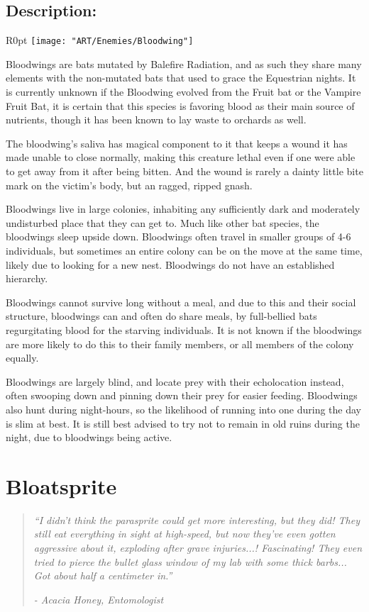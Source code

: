\documentclass[11pt,a4paper,twocolumn]{book}
\begin{document}
	\subsection*{Description:}
	\begin{wrapfigure}{R}{0pt}
		\texttt{[image: "ART/Enemies/Bloodwing"]}
	\end{wrapfigure}
	
	Bloodwings are bats mutated by Balefire Radiation, and as such they share many elements with the non-mutated bats that used to grace the Equestrian nights. It is currently unknown if the Bloodwing evolved from the Fruit bat or the Vampire Fruit Bat, it is certain that this species is favoring blood as their main source of nutrients, though it has been known to lay waste to orchards as well. 
	
	The bloodwing's saliva has magical component to it that keeps a wound it has made unable to close normally, making this creature lethal even if one were able to get away from it after being bitten. And the wound is rarely a dainty little bite mark on the victim's body, but an ragged, ripped gnash.
	
	\bigskip
	Bloodwings live in large colonies, inhabiting any sufficiently dark and moderately undisturbed place that they can get to. Much like other bat species, the bloodwings sleep upside down. Bloodwings often travel in smaller groups of 4-6 individuals, but sometimes an entire colony can be on the move at the same time, likely due to looking for a new nest. Bloodwings do not have an established hierarchy. 
	
	Bloodwings cannot survive long without a meal, and due to this and their social structure, bloodwings can and often do share meals, by full-bellied bats regurgitating blood for the starving individuals. It is not known if the bloodwings are more likely to do this to their family members, or all members of the colony equally.
	
	Bloodwings are largely blind, and locate prey with their echolocation instead, often swooping down and pinning down their prey for easier feeding. Bloodwings also hunt during night-hours, so the likelihood of running into one during the day is slim at best. It is still best advised to try not to remain in old ruins during the night, due to bloodwings being active.
	
	\clearpage
	
	\section*{Bloatsprite}
	\begin{quote}
		\emph{``I didn't think the parasprite could get more interesting, but they did! They still eat everything in sight at high-speed, but now they've even gotten aggressive about it, exploding after grave injuries...! Fascinating! They even tried to pierce the bullet glass window of my lab with some thick barbs... Got about half a centimeter in.''}
		
		\emph{-	Acacia Honey, Entomologist}
	\end{quote}
	
\end{document}
